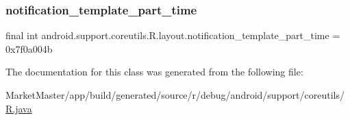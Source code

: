 \subsubsection{\texorpdfstring{notification\+\_\+template\+\_\+part\+\_\+time}{notification\_template\_part\_time}}
{\footnotesize\ttfamily final int android.\+support.\+coreutils.\+R.\+layout.\+notification\+\_\+template\+\_\+part\+\_\+time = 0x7f0a004b\hspace{0.3cm}{\ttfamily [static]}}



The documentation for this class was generated from the following file\+:\begin{DoxyCompactItemize}
\item 
Market\+Master/app/build/generated/source/r/debug/android/support/coreutils/\mbox{\hyperlink{debug_2android_2support_2coreutils_2R_8java}{R.\+java}}\end{DoxyCompactItemize}
